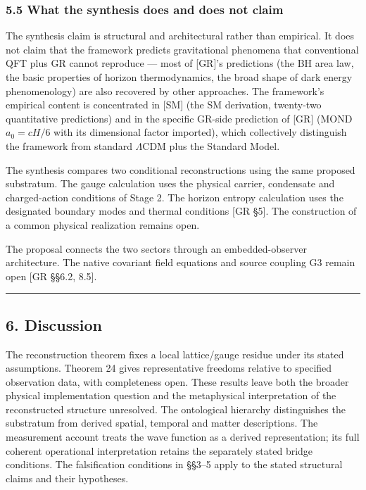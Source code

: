 \documentclass[
]{article}
\begin{document}
\hypertarget{what-the-synthesis-does-and-does-not-claim}{%
\subsubsection{5.5 What the synthesis does and does not
claim}\label{what-the-synthesis-does-and-does-not-claim}}

The synthesis claim is structural and architectural rather than
empirical. It does not claim that the framework predicts gravitational
phenomena that conventional QFT plus GR cannot reproduce --- most of
{[}GR{]}'s predictions (the BH area law, the basic properties of horizon
thermodynamics, the broad shape of dark energy phenomenology) are also
recovered by other approaches. The framework's empirical content is
concentrated in {[}SM{]} (the SM derivation, twenty-two quantitative
predictions) and in the specific GR-side prediction of {[}GR{]} (MOND
\(a_0 = cH/6\) with its dimensional factor imported), which collectively
distinguish the framework from standard \(\Lambda\)CDM plus the Standard
Model.

The synthesis compares two conditional reconstructions using the same
proposed substratum. The gauge calculation uses the physical carrier,
condensate and charged-action conditions of Stage 2. The horizon entropy
calculation uses the designated boundary modes and thermal conditions
{[}GR §5{]}. The construction of a common physical realization remains
open.

The proposal connects the two sectors through an embedded-observer
architecture. The native covariant field equations and source coupling
G3 remain open {[}GR §§6.2, 8.5{]}.

\begin{center}\rule{0.5\linewidth}{0.5pt}\end{center}

\hypertarget{discussion}{%
\subsection{6. Discussion}\label{discussion}}

The reconstruction theorem fixes a local lattice/gauge residue under its
stated assumptions. Theorem 24 gives representative freedoms relative to
specified observation data, with completeness open. These results leave
both the broader physical implementation question and the metaphysical
interpretation of the reconstructed structure unresolved. The
ontological hierarchy distinguishes the substratum from derived spatial,
temporal and matter descriptions. The measurement account treats the
wave function as a derived representation; its full coherent operational
interpretation retains the separately stated bridge conditions. The
falsification conditions in §§3--5 apply to the stated structural claims
and their hypotheses.
\end{document}
